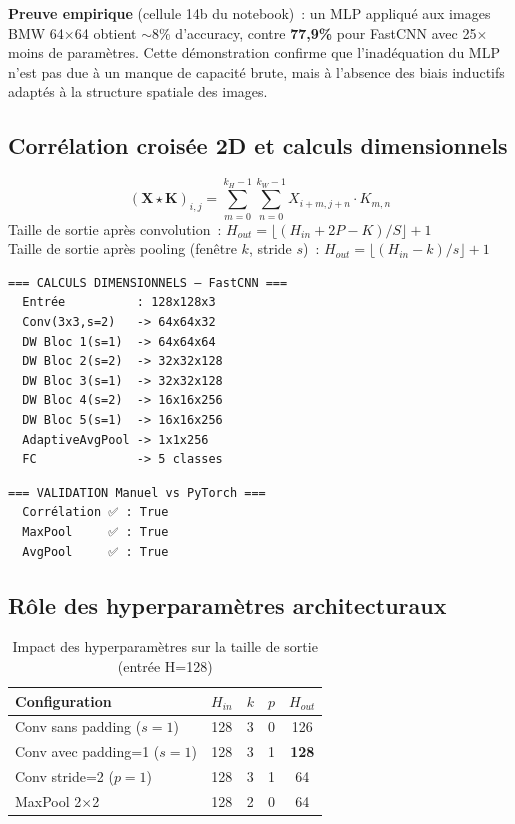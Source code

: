 \documentclass[12pt,a4paper]{report}
\begin{document}
\textbf{Preuve empirique} (cellule 14b du notebook)~: un MLP appliqué aux images BMW 64$\times$64 
obtient $\sim$8\% d'accuracy, contre \textbf{77,9\%} pour FastCNN avec 25$\times$ moins de 
paramètres. Cette démonstration confirme que l'inadéquation du MLP n'est pas due à un manque 
de capacité brute, mais à l'absence des biais inductifs adaptés à la structure spatiale des images.

\subsection{Corrélation croisée 2D et calculs dimensionnels}

\begin{formulebox}
\[
  (\mathbf{X}\star\mathbf{K})_{i,j}
  = \sum_{m=0}^{k_H-1}\sum_{n=0}^{k_W-1} X_{i+m,j+n}\cdot K_{m,n}
\]
Taille de sortie après convolution~:
$H_{out}=\lfloor(H_{in}+2P-K)/S\rfloor+1$\\
Taille de sortie après pooling (fenêtre $k$, stride $s$)~:
$H_{out}=\lfloor(H_{in}-k)/s\rfloor+1$
\end{formulebox}

\begin{outputbox}
\begin{verbatim}
=== CALCULS DIMENSIONNELS — FastCNN ===
  Entrée          : 128x128x3
  Conv(3x3,s=2)   -> 64x64x32
  DW Bloc 1(s=1)  -> 64x64x64
  DW Bloc 2(s=2)  -> 32x32x128
  DW Bloc 3(s=1)  -> 32x32x128
  DW Bloc 4(s=2)  -> 16x16x256
  DW Bloc 5(s=1)  -> 16x16x256
  AdaptiveAvgPool -> 1x1x256
  FC              -> 5 classes
\end{verbatim}
\end{outputbox}

\begin{outputbox}
\begin{verbatim}
=== VALIDATION Manuel vs PyTorch ===
  Corrélation ✅ : True
  MaxPool     ✅ : True
  AvgPool     ✅ : True
\end{verbatim}
\end{outputbox}

\subsection{Rôle des hyperparamètres architecturaux}

\begin{table}[H]
\centering
\caption{Impact des hyperparamètres sur la taille de sortie (entrée H=128)}
\begin{tabular}{lcccc}
\toprule
\textbf{Configuration} & $H_{in}$ & $k$ & $p$ & $H_{out}$ \\
\midrule
Conv sans padding ($s=1$) & 128 & 3 & 0 & 126 \\
Conv avec padding=1 ($s=1$) & 128 & 3 & 1 & \textbf{128} \\
Conv stride=2 ($p=1$) & 128 & 3 & 1 & 64 \\
MaxPool 2$\times$2 & 128 & 2 & 0 & 64 \\
\bottomrule
\end{tabular}
\end{table}
\end{document}
